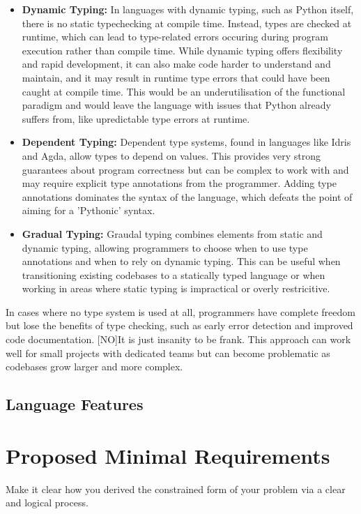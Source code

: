 \documentclass{l4proj}
\begin{document}
\begin{itemize}
    \item \textbf{Dynamic Typing:} In languages with dynamic typing, such as Python itself, there is no static typechecking at compile time.
    Instead, types are checked at runtime, which can lead to type-related errors occuring during program execution rather than compile time. 
    While dynamic typing offers flexibility and rapid development, it can also make code harder to understand and maintain, and it may result in runtime type errors that could have been caught at compile time.
    This would be an underutilisation of the functional paradigm and would leave the language with issues that Python already suffers from, like upredictable type errors at runtime.
    \item \textbf{Dependent Typing:} Dependent type systems, found in languages like Idris and Agda, allow types to depend on values.
    This provides very strong guarantees about program correctness but can be complex to work with and may require explicit type annotations from the programmer.
    Adding type annotations dominates the syntax of the language, which defeats the point of aiming for a 'Pythonic' syntax.
    \item \textbf{Gradual Typing:} Graudal typing combines elements from static and dynamic typing, allowing programmers to choose when to use type annotations and when to rely on dynamic typing.
    This can be useful when transitioning existing codebases to a statically typed language or when working in areas where static typing is impractical or overly restricitive.
\end{itemize}

In cases where no type system is used at all, programmers have complete freedom but lose the benefits of type checking, such as early error detection and improved code documentation.
[NO]It is just insanity to be frank.
This approach can work well for small projects with dedicated teams but can become problematic as codebases grow larger and more complex.

\subsection{Language Features}

\section{Proposed Minimal Requirements}
Make it clear how you derived the constrained form of your problem via a clear and logical process. 
\end{document}

